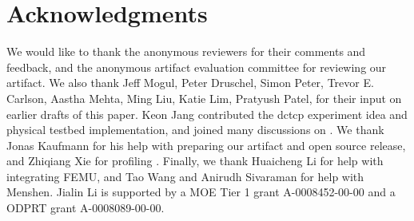 \section*{Acknowledgments}
We would like to thank the anonymous reviewers for their comments and feedback,
and the anonymous artifact evaluation committee for reviewing our artifact.
%
We also thank Jeff Mogul, Peter Druschel, Simon Peter, Trevor E. Carlson, Aastha
Mehta, Ming Liu, Katie Lim, Pratyush Patel, for their input on earlier drafts of this paper.
%
Keon Jang contributed the dctcp experiment idea and physical testbed
implementation, and joined many discussions on \sysname.
%
We thank Jonas Kaufmann for his help with preparing our artifact and open source
release, and Zhiqiang Xie for profiling \sysname.
%
Finally, we thank Huaicheng Li for help with integrating FEMU, and Tao
Wang and Anirudh Sivaraman for help with Menshen.
%
Jialin Li is supported by a MOE Tier 1 grant A-0008452-00-00 and a ODPRT grant
A-0008089-00-00.
